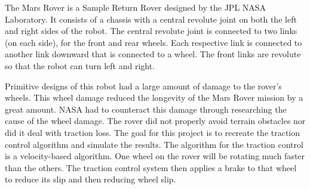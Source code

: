 The Mars Rover is a Sample Return Rover designed by the JPL NASA Laboratory. It consists of a chassis with a central revolute joint on both the left and right sides of the robot. The central revolute joint is connected to two links (on each side),  for the front and rear wheels. Each respective link is connected to another link downward that is connected to a wheel. The front links are revolute so that the robot can turn left and right.

Primitive designs of this robot had a large amount of damage to the rover’s wheels. This wheel damage reduced the longevity of the Mars Rover mission by a great amount. NASA had to counteract this damage through researching the cause of the wheel damage. The rover did not properly avoid terrain obstacles nor did it deal with traction loss. The goal for this project is to recreate the traction control algorithm and simulate the results. The algorithm for the traction control is a velocity-based algorithm. One wheel on the rover will be rotating much faster than the others. The traction control system then applies a brake to that wheel to reduce its slip and then reducing wheel slip.


